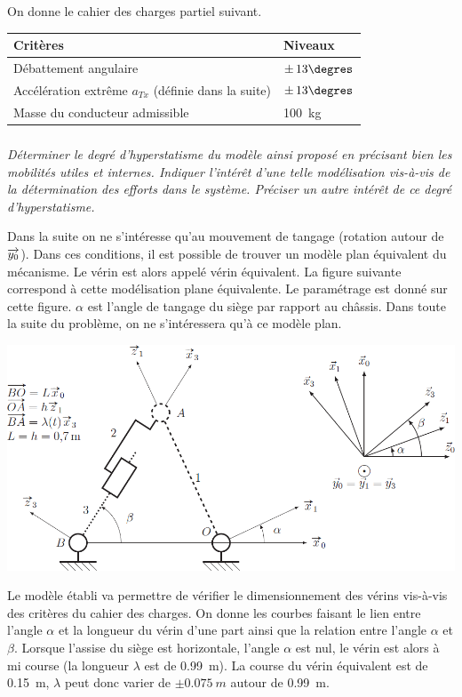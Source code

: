 \documentclass[10pt,fleqn]{article} %
\begin{document}
\begin{multicols}{2}
On donne le cahier des charges partiel suivant. 
\begin{center}
\begin{tabular}{|p{.45\linewidth}|p{.45\linewidth}|}
\hline
Critères &  Niveaux \\ \hline
Débattement angulaire & $\pm \, 13\degres$ \\ \hline
Accélération extrême $a_{Tx}$ (définie dans la suite) & 
$\pm \, 13\degres$ \\ \hline
Masse du conducteur admissible & \SI{100}{kg} \\
\hline 

\end{tabular}
\end{center}
\subparagraph{}\textit{Déterminer le degré d’hyperstatisme du modèle ainsi proposé en précisant bien les mobilités
utiles et internes. Indiquer l’intérêt d’une telle modélisation vis-à-vis de la détermination
des efforts dans le système. Préciser un autre intérêt de ce degré d’hyperstatisme.}


Dans la suite on ne s’intéresse qu’au mouvement de tangage (rotation
autour de $\overrightarrow{y_0}$). Dans ces conditions, il est possible de trouver un modèle plan équivalent du
mécanisme. Le vérin est alors appelé vérin équivalent.
La figure suivante correspond à cette modélisation plane équivalente. Le paramétrage est donné
sur cette figure. $\alpha$ est l’angle de tangage du siège par rapport au châssis. Dans toute la suite du problème, on ne s’intéressera qu’à ce modèle plan.


\begin{center}
\includegraphics[width=.95\linewidth]{images/fig_03}
\end{center}

Le modèle établi va permettre de vérifier le dimensionnement des vérins vis-à-vis des critères du cahier des charges. On donne les courbes faisant le lien entre l'angle $\alpha$ et la longueur du vérin d'une part ainsi que la relation entre l'angle $\alpha$ et $\beta$. Lorsque l’assise du siège est horizontale, l’angle $\alpha$ est nul, le vérin
est alors à mi course (la longueur $\lambda$ est de \SI{0,99}{m}). La course du vérin équivalent est de \SI{0,15}{m},
 $\lambda$ peut donc varier de $\pm \SI{0,075}{m}$ autour de \SI{0,99}{m}.


\end{multicols}
\end{document}

